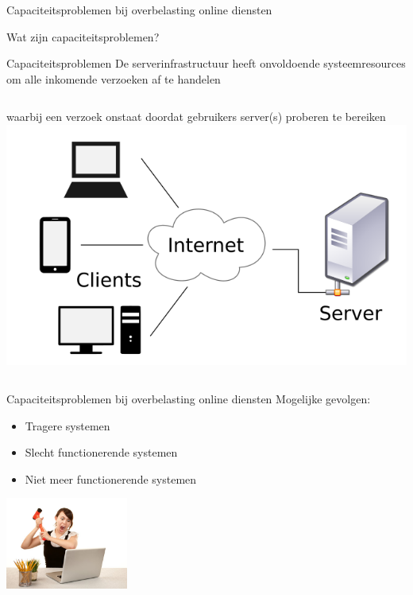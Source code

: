 \documentclass{beamer}
\begin{document}
\begin{frame}{Capaciteitsproblemen bij overbelasting online diensten}
    
    Wat zijn capaciteitsproblemen?
    
    \begin{alertblock}{Capaciteitsproblemen}
        De serverinfrastructuur heeft onvoldoende systeemresources
        om alle inkomende verzoeken af te handelen
    \end{alertblock}

    \begin{columns}
            waarbij een verzoek onstaat doordat gebruikers server(s) proberen te bereiken
            \centering
            \includegraphics[width = \textwidth]{server-verzoeken.png}
    \end{columns} 

\end{frame}


\begin{frame}{Capaciteitsproblemen bij overbelasting online diensten}
    Mogelijke gevolgen:
    \begin{itemize}
        \item Tragere systemen
        \item Slecht functionerende systemen
        \item Niet meer functionerende systemen
    \end{itemize}
    \begin{center}
        \includegraphics[height = 3cm]{destroy-computer.jpg}        
    \end{center}
\end{frame}
\end{document}

